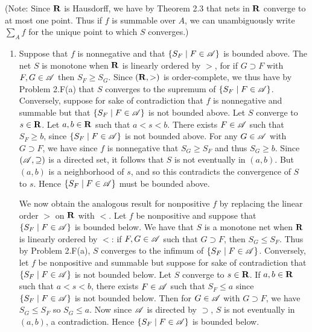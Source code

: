 \begin{prob}
(Note: Since $\mathbf{R}$ is Hausdorff, we have by Theorem 2.3 that nets in $\mathbf{R}$ converge to at most one point. Thus if $f$ is summable over $A$, we can unambiguously write $\sum_Af$ for the unique point to which $S$ converges.)
\begin{enumerate}
\item Suppose that $f$ is nonnegative and that $\{S_F \mid F \in \mathscr{A}\}$ is bounded above. The net $S$ is monotone when $\mathbf{R}$ is linearly ordered by $>$, for if $G\supset F$ with $F, G \in \mathscr{A}$ then $S_F \geq S_G$. Since $(\mathbf{R}, >)$ is order-complete, we thus have by Problem 2.F(a) that $S$ converges to the supremum of $\{S_F\mid F \in \mathscr{A}\}$. Conversely, suppose for sake of contradiction that $f$ is nonnegative and summable but that $\{S_F\mid F \in \mathscr{A}\}$ is not bounded above. Let $S$ converge to $s \in \mathbf{R}$. Let $a, b \in \mathbf{R}$ such that $a < s < b$. There exists $F \in \mathscr{A}$ such that $S_F \geq b$, since $\{S_F\mid F \in \mathscr{A}\}$ is not bounded above. For any $G \in \mathscr{A}$ with $G \supset F$, we have since $f$ is nonnegative that $S_G \geq S_F$ and thus $S_G \geq b$. Since $(\mathscr{A}, \supseteq)$ is a directed set, it follows that $S$ is not eventually in $(a, b)$. But $(a, b)$ is a neighborhood of $s$, and so this contradicts the convergence of $S$ to $s$. Hence $\{S_F\mid F \in \mathscr{A}\}$ must be bounded above.

We now obtain the analogous result for nonpositive $f$ by replacing the linear order $>$ on $\mathbf{R}$ with $<$. Let $f$ be nonpositive and suppose that $\{S_F\mid F \in \mathscr{A}\}$ is bounded below. We have that $S$ is a monotone net when $\mathbf{R}$ is linearly ordered by $<$: if $F, G \in \mathscr{A}$ such that $G \supset F$, then $S_G \leq S_F$. Thus by Problem 2.F(a), $S$ converges to the infimum of $\{S_F\mid F \in \mathscr{A}\}$. Conversely, let $f$ be nonpositive and summable but suppose for sake of contradiction that $\{S_F\mid F \in \mathscr{A}\}$ is not bounded below. Let $S$ converge to $s \in \mathbf{R}$. If $a, b \in \mathbf{R}$ such that $a < s < b$, there exists $F \in \mathscr{A}$ such that $S_F \leq a$ since $\{S_F\mid F \in \mathscr{A}\}$ is not bounded below. Then for $G \in \mathscr{A}$ with $G \supset F$, we have $S_G \leq S_F$ so $S_G \leq a$. Now since $\mathscr{A}$ is directed by $\supset$, $S$ is not eventually in $(a, b)$, a contradiction. Hence $\{S_F\mid F \in \mathscr{A}\}$ is bounded below.


\end{enumerate}
\end{prob}
